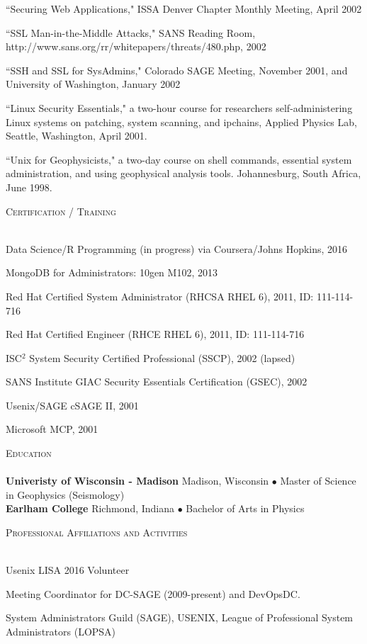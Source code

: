 \documentclass{article}
\newcommand{\lineunder}{\vspace*{-8pt} \\ \hspace*{-18pt} \hrulefill \\}
\newcommand{\header}[1]{{\hspace*{-15pt}\vspace*{6pt} \textsc{#1}} \vspace*{-6pt} \lineunder}
\newenvironment{achievements}{\begin{list}{\topsep 0pt \itemsep -2pt}} {\vspace*{4pt}\end{list}}
\newcommand{\school}[3]{
 \textbf{#1} #2 $\bullet$ #3\\
}
\begin{document}
\begin{achievements}
\item ``Securing Web Applications," ISSA Denver Chapter Monthly Meeting, April 2002
\item ``SSL Man-in-the-Middle Attacks," SANS Reading Room, http://www.sans.org/rr/whitepapers/threats/480.php, 2002
\item ``SSH and SSL for SysAdmins," Colorado SAGE Meeting, November 2001, and University of Washington, January 2002
\item ``Linux Security Essentials," a two-hour course for researchers self-administering Linux systems on patching, system scanning, and ipchains,  Applied Physics Lab, Seattle, Washington, April 2001.
\item ``Unix for Geophysicists," a two-day course on shell commands, essential system administration, and using geophysical analysis tools.  Johannesburg, South Africa, June 1998.
\end{achievements}


\header{Certification / Training}
\begin{achievements}
\item Data Science/R Programming (in progress) via Coursera/Johns Hopkins, 2016
\item MongoDB for Administrators: 10gen M102, 2013
\item Red Hat Certified System Administrator (RHCSA RHEL 6), 2011, ID: 111-114-716
\item Red Hat Certified Engineer (RHCE RHEL 6), 2011, ID: 111-114-716
\item ISC$^{2}$ System Security Certified Professional (SSCP), 2002 (lapsed)
\item SANS Institute GIAC Security Essentials Certification (GSEC), 2002
\item Usenix/SAGE cSAGE II, 2001
\item Microsoft MCP, 2001
\end{achievements}

\header{Education}

\school{Univeristy of Wisconsin - Madison}{Madison, Wisconsin} {Master of Science in Geophysics (Seismology)}
\school{Earlham College}{Richmond, Indiana}{Bachelor of Arts in Physics}
\vspace{18pt}

\header{Professional Affiliations and Activities}
\begin{achievements}
\item Usenix LISA 2016 Volunteer
\item Meeting Coordinator for DC-SAGE (2009-present) and DevOpsDC.
\item System Administrators Guild (SAGE), USENIX, League of Professional System Administrators (LOPSA)
\end{achievements}
\end{document}
